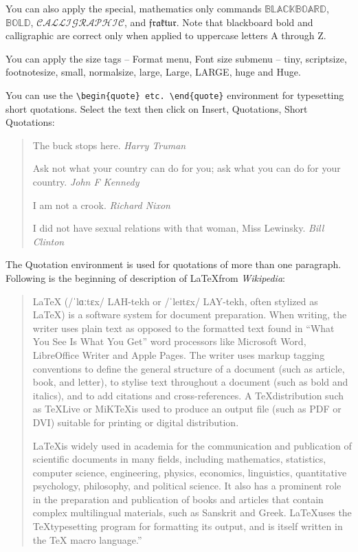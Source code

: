 \documentclass{book}\usepackage{knitr}
\begin{document}
You can also apply the special, mathematics only commands $\mathbb{BLACKBOARD}$, $\mathbb{BOLD}$, $\mathcal{CALLIGRAPHIC}$, and $\mathfrak{fraktur}$. Note that blackboard bold and calligraphic are correct only when applied to uppercase letters A through Z.

You can apply the size tags -- Format menu, Font size submenu -- {\tiny tiny}, {\scriptsize scriptsize}, {\footnotesize footnotesize}, {\small small}, {\normalsize normalsize}, {\large large}, {\Large Large}, {\LARGE LARGE}, {\huge huge} and {\Huge Huge}.

You can use the \verb"\begin{quote} etc. \end{quote}" environment for typesetting short quotations. Select the text then click on Insert, Quotations, Short Quotations:

\begin{quote}
The buck stops here. \emph{Harry Truman}

Ask not what your country can do for you; ask what you can do for your
country. \emph{John F Kennedy}

I am not a crook. \emph{Richard Nixon}

I did not have sexual relations with that woman, Miss Lewinsky. \emph{Bill Clinton}
\end{quote}

The Quotation environment is used for quotations of more than one paragraph. Following is the beginning of description of \LaTeX from \emph{Wikipedia}:

\begin{quotation}
LaTeX (/ˈlɑːtɛx/ LAH-tekh or /ˈleɪtɛx/ LAY-tekh, often stylized as \LaTeX) is a software system for document preparation. When writing, the writer uses plain text as opposed to the formatted text found in ``What You See Is What You Get'' word processors like Microsoft Word, LibreOffice Writer and Apple Pages. The writer uses markup tagging conventions to define the general structure of a document (such as article, book, and letter), to stylise text throughout a document (such as bold and italics), and to add citations and cross-references. A \TeX distribution such as \TeX Live or MiK\TeX is used to produce an output file (such as PDF or DVI) suitable for printing or digital distribution.

\LaTeX is widely used in academia for the communication and publication of scientific documents in many fields, including mathematics, statistics, computer science, engineering, physics, economics, linguistics, quantitative psychology, philosophy, and political science. It also has a prominent role in the preparation and publication of books and articles that contain complex multilingual materials, such as Sanskrit and Greek. \LaTeX uses the \TeX typesetting program for formatting its output, and is itself written in the TeX macro language.''
\end{quotation}
\end{document}
